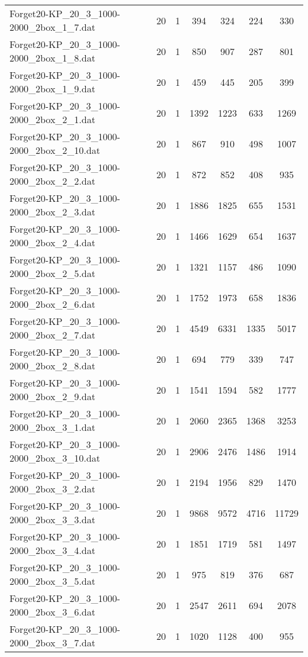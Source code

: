 \begin{table}[!ht]
\begin{tabular}{lcccccc}
Forget20-KP\_20\_3\_1000-2000\_2box\_1\_7.dat & 20 & 1 & 394 & 324 & 224 & 330 \\
Forget20-KP\_20\_3\_1000-2000\_2box\_1\_8.dat & 20 & 1 & 850 & 907 & 287 & 801 \\
Forget20-KP\_20\_3\_1000-2000\_2box\_1\_9.dat & 20 & 1 & 459 & 445 & 205 & 399 \\
Forget20-KP\_20\_3\_1000-2000\_2box\_2\_1.dat & 20 & 1 & 1392 & 1223 & 633 & 1269 \\
Forget20-KP\_20\_3\_1000-2000\_2box\_2\_10.dat & 20 & 1 & 867 & 910 & 498 & 1007 \\
Forget20-KP\_20\_3\_1000-2000\_2box\_2\_2.dat & 20 & 1 & 872 & 852 & 408 & 935 \\
Forget20-KP\_20\_3\_1000-2000\_2box\_2\_3.dat & 20 & 1 & 1886 & 1825 & 655 & 1531 \\
Forget20-KP\_20\_3\_1000-2000\_2box\_2\_4.dat & 20 & 1 & 1466 & 1629 & 654 & 1637 \\
Forget20-KP\_20\_3\_1000-2000\_2box\_2\_5.dat & 20 & 1 & 1321 & 1157 & 486 & 1090 \\
Forget20-KP\_20\_3\_1000-2000\_2box\_2\_6.dat & 20 & 1 & 1752 & 1973 & 658 & 1836 \\
Forget20-KP\_20\_3\_1000-2000\_2box\_2\_7.dat & 20 & 1 & 4549 & 6331 & 1335 & 5017 \\
Forget20-KP\_20\_3\_1000-2000\_2box\_2\_8.dat & 20 & 1 & 694 & 779 & 339 & 747 \\
Forget20-KP\_20\_3\_1000-2000\_2box\_2\_9.dat & 20 & 1 & 1541 & 1594 & 582 & 1777 \\
Forget20-KP\_20\_3\_1000-2000\_2box\_3\_1.dat & 20 & 1 & 2060 & 2365 & 1368 & 3253 \\
Forget20-KP\_20\_3\_1000-2000\_2box\_3\_10.dat & 20 & 1 & 2906 & 2476 & 1486 & 1914 \\
Forget20-KP\_20\_3\_1000-2000\_2box\_3\_2.dat & 20 & 1 & 2194 & 1956 & 829 & 1470 \\
Forget20-KP\_20\_3\_1000-2000\_2box\_3\_3.dat & 20 & 1 & 9868 & 9572 & 4716 & 11729 \\
Forget20-KP\_20\_3\_1000-2000\_2box\_3\_4.dat & 20 & 1 & 1851 & 1719 & 581 & 1497 \\
Forget20-KP\_20\_3\_1000-2000\_2box\_3\_5.dat & 20 & 1 & 975 & 819 & 376 & 687 \\
Forget20-KP\_20\_3\_1000-2000\_2box\_3\_6.dat & 20 & 1 & 2547 & 2611 & 694 & 2078 \\
Forget20-KP\_20\_3\_1000-2000\_2box\_3\_7.dat & 20 & 1 & 1020 & 1128 & 400 & 955 \\

\end{tabular}
\end{table}

